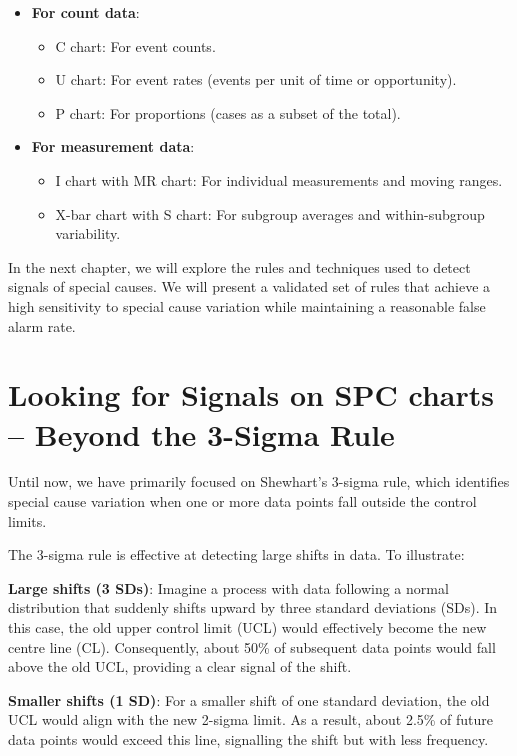 \documentclass[
]{book}
\providecommand{\tightlist}{%
  \setlength{\itemsep}{0pt}\setlength{\parskip}{0pt}}
\begin{document}
\begin{itemize}
\tightlist
\item
  \textbf{For count data}:

  \begin{itemize}
  \tightlist
  \item
    C chart: For event counts.
  \item
    U chart: For event rates (events per unit of time or opportunity).
  \item
    P chart: For proportions (cases as a subset of the total).
  \end{itemize}
\item
  \textbf{For measurement data}:

  \begin{itemize}
  \tightlist
  \item
    I chart with MR chart: For individual measurements and moving ranges.
  \item
    X-bar chart with S chart: For subgroup averages and within-subgroup variability.
  \end{itemize}
\end{itemize}

In the next chapter, we will explore the rules and techniques used to detect signals of special causes. We will present a validated set of rules that achieve a high sensitivity to special cause variation while maintaining a reasonable false alarm rate.

\chapter{Looking for Signals on SPC charts -- Beyond the 3-Sigma Rule}\label{testing}

Until now, we have primarily focused on Shewhart's 3-sigma rule, which identifies special cause variation when one or more data points fall outside the control limits.

The 3-sigma rule is effective at detecting large shifts in data. To illustrate:

\textbf{Large shifts (3 SDs)}: Imagine a process with data following a normal distribution that suddenly shifts upward by three standard deviations (SDs). In this case, the old upper control limit (UCL) would effectively become the new centre line (CL). Consequently, about 50\% of subsequent data points would fall above the old UCL, providing a clear signal of the shift.

\textbf{Smaller shifts (1 SD)}: For a smaller shift of one standard deviation, the old UCL would align with the new 2-sigma limit. As a result, about 2.5\% of future data points would exceed this line, signalling the shift but with less frequency.
\end{document}
